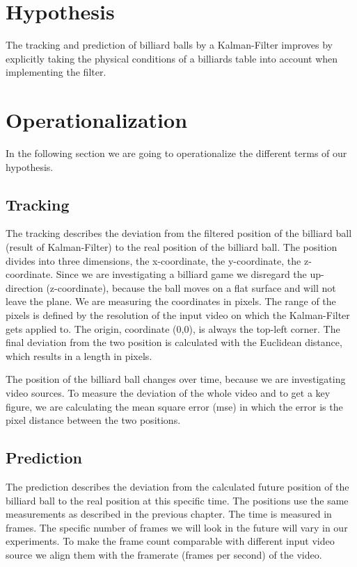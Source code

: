 \documentclass[titlepage, a4paper, 11pt]{scrartcl}
\begin{document}
\section{Hypothesis}

The tracking and prediction of billiard balls by a Kalman-Filter improves by explicitly taking the physical conditions of a billiards table into account when implementing the filter.

\section{Operationalization}

In the following section we are going to operationalize the different terms of our hypothesis.

\subsection{Tracking}

The tracking describes the deviation from the filtered position of the billiard ball (result of Kalman-Filter) to the real position of the billiard ball.
The position divides into three dimensions, the x-coordinate, the y-coordinate, the z-coordinate.
Since we are investigating a billiard game we disregard the up-direction (z-coordinate), because the ball moves on a flat surface and will not leave the plane.
We are measuring the coordinates in pixels. The range of the pixels is defined by the resolution of the input video on which the Kalman-Filter gets applied to.
The origin, coordinate (0,0), is always the top-left corner.
The final deviation from the two position is calculated with the Euclidean distance, which results in a length in pixels.

The position of the billiard ball changes over time, because we are investigating video sources.
To measure the deviation of the whole video and to get a key figure, we are calculating the mean square error (mse) in which the error is the pixel distance between the two positions. 

\subsection{Prediction}

The prediction describes the deviation from the calculated future position of the billiard ball to the real position at this specific time.
The positions use the same measurements as described in the previous chapter.
The time is measured in frames. The specific number of frames we will look in the future will vary in our experiments.
To make the frame count comparable with different input video source we align them with the framerate (frames per second) of the video.
\end{document}
